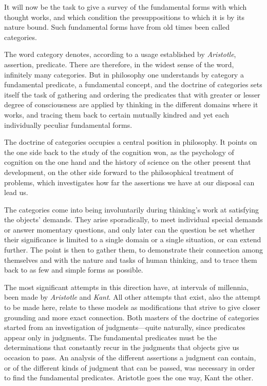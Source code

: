 \documentclass[12pt,a4paper]{book}
\newcommand{\opage}[1]{\marginnote{\footnotesize\textit{[#1]}}}
\begin{document}
It will now be the task to give a survey of the fundamental forms with
which thought works, and which condition the presuppositions to which it is by
its nature bound. Such fundamental forms have from old times been called
categories.

The word category denotes, according to a usage established by
\emph{Aristotle}, assertion, predicate. There are therefore, in the widest
sense of the word, infinitely many categories. But in philosophy one
understands by category a fundamental predicate, a fundamental concept, and
the doctrine of categories sets itself the task of gathering and ordering
the predicates that with greater or lesser degree of consciousness are
applied by thinking in the different domains where it works, and tracing
them back to certain \opage{136}mutually kindred and yet each individually peculiar
fundamental forms.

The doctrine of categories occupies a central position in philosophy. It
points on the one side back to the study of the cognition won, as the
psychology of cognition on the one hand and the history of science on the
other present that development, on the other side forward to the
philosophical treatment of problems, which investigates how far the
assertions we have at our disposal can lead us.

The categories come into being involuntarily during thinking's work at
satisfying the objects' demands. They arise sporadically, to meet
individual special demands or answer momentary questions, and only later
can the question be set whether their significance is limited to a single
domain or a single situation, or can extend further. The point is then to
gather them, to demonstrate their connection among themselves and with the
nature and tasks of human thinking, and to trace them back to as few and
simple forms as possible.

The most significant attempts in this direction have, at intervals of
millennia, been made by \emph{Aristotle} and \emph{Kant}. All other
attempts that exist, also the attempt to be made here, relate to these
models as modifications that strive to give closer grounding and more exact
connection. Both masters of the doctrine of categories started from an
investigation of judgments---quite naturally, since predicates appear only
in judgments. The fundamental predicates must be the determinations that
constantly recur in the judgments that objects give us occasion to pass. An
analysis of the different assertions a judgment can contain, or of the
different kinds of judgment that can be passed, was necessary in order to
find the fundamental predicates. Aristotle goes the one way, Kant the
other.
\end{document}
